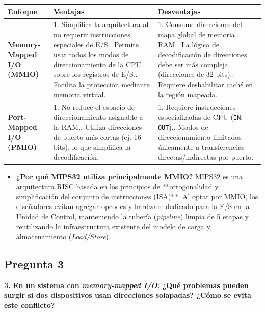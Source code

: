 \documentclass[12pt, letterpaper]{article}
\begin{document}
\begin{table}[h!]
\centering
\small
\begin{tabular}{p{2.8cm} p{6.2cm} p{6.2cm}}
\toprule
\textbf{Enfoque} & \textbf{Ventajas} & \textbf{Desventajas} \\
\midrule
\textbf{Memory-Mapped I/O (MMIO)} 
& 1. Simplifica la arquitectura al no requerir instrucciones especiales de E/S.\newline
  2. Permite usar todos los modos de direccionamiento de la CPU sobre los registros de E/S.\newline
  3. Facilita la protección mediante memoria virtual.
& 1. Consume direcciones del mapa global de memoria RAM.\newline
  2. La lógica de decodificación de direcciones debe ser más compleja (direcciones de 32 bits).\newline
  3. Requiere deshabilitar caché en la región mapeada. \\
\midrule
\textbf{Port-Mapped I/O (PMIO)} 
& 1. No reduce el espacio de direccionamiento asignable a la RAM.\newline
  2. Utiliza direcciones de puerto más cortas (ej. 16 bits), lo que simplifica la decodificación.
& 1. Requiere instrucciones especializadas de CPU (\texttt{IN}, \texttt{OUT}).\newline
  2. Modos de direccionamiento limitados únicamente a transferencias directas/indirectas por puerto. \\
\bottomrule
\end{tabular}
\end{table}

\begin{itemize}
    \item \textbf{¿Por qué MIPS32 utiliza principalmente MMIO?}
    MIPS32 es una arquitectura RISC basada en los principios de **ortogonalidad y simplificación del conjunto de instrucciones (ISA)**. Al optar por MMIO, los diseñadores evitan agregar opcodes y hardware dedicado para la E/S en la Unidad de Control, manteniendo la tubería (\textit{pipeline}) limpia de 5 etapas y reutilizando la infraestructura existente del modelo de carga y almacenamiento (\textit{Load/Store}).
\end{itemize}

\hr

\subsection*{Pregunta 3}
\textbf{3. En un sistema con \textit{memory-mapped I/O}: ¿Qué problemas pueden surgir si dos dispositivos usan direcciones solapadas? ¿Cómo se evita este conflicto?}
\end{document}
